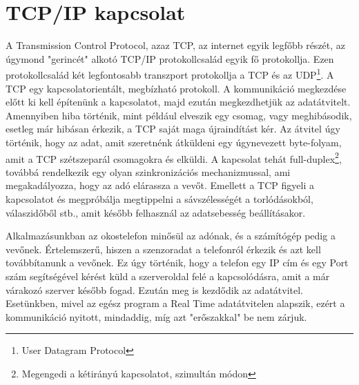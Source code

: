 \documentclass{thesis-ekf}
\theoremstyle{definition}
\theoremstyle{remark}
\begin{document}
\section{TCP/IP kapcsolat}
A Transmission Control Protocol, azaz TCP, az internet egyik legfőbb részét, az úgymond "gerincét" alkotó TCP/IP protokollcsalád egyik fő protokollja. Ezen protokollcsalád két legfontosabb transzport protokollja a TCP és az UDP\footnote{User Datagram Protocol}. A TCP egy kapcsolatorientált, megbízható protokoll. A kommunikáció megkezdése előtt ki kell építenünk a kapcsolatot, majd ezután megkezdhetjük az adatátvitelt. Amennyiben hiba történik, mint például elveszik egy csomag, vagy meghibásodik, esetleg már hibásan érkezik, a TCP saját maga újraindítást kér. Az átvitel úgy történik, hogy az adat, amit szeretnénk átküldeni egy úgynevezett byte-folyam, amit a TCP szétszeparál csomagokra és elküldi. A kapcsolat tehát full-duplex\footnote{Megengedi a kétirányú kapcsolatot, szimultán módon}, továbbá rendelkezik egy olyan szinkronizációs mechanizmussal, ami megakadályozza, hogy az adó elárassza a vevőt. Emellett a TCP figyeli a kapcsolatot és megpróbálja megtippelni a sávszélességét a torlódásokból, válaszidőből stb., amit később felhasznál az adatsebesség beállításakor.

\par Alkalmazásunkban az okostelefon minősül az adónak, és a számítógép pedig a vevőnek. Értelemszerű, hiszen a szenzoradat a telefonról érkezik és azt kell továbbítanunk a vevőnek. Ez úgy történik, hogy a telefon egy IP cím és egy Port szám segítségével kérést küld a szerveroldal felé a kapcsolódásra, amit a már várakozó szerver később fogad. Ezután meg is kezdődik az adatátvitel. Esetünkben, mivel az egész program a Real Time adatátvitelen alapszik, ezért a kommunikáció nyitott, mindaddig, míg azt "erőszakkal" be nem zárjuk.
\end{document}
